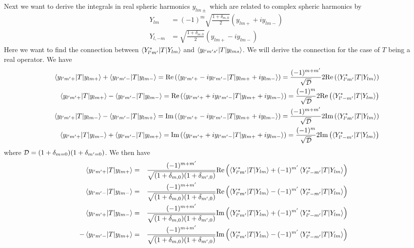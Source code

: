 \documentclass[aps,prb,floatfix,epsfig,singlecolumn,showpacs,preprintnumbers]{revtex4}
\newcommand{\cD}{{\cal D}}
\renewcommand{\Im}{\textrm{Im}}
\renewcommand{\Re}{\textrm{Re}}
\begin{document}
Next we want to derive the integrals in real spheric harmonics
$y_{lm\pm}$ which are related to complex spheric harmonics by
\begin{eqnarray}
&Y_{lm}&=(-1)^m \sqrt{\frac{1+\delta_{m,0}}{2}}(y_{lm+}+i y_{lm-})\\
&Y_{l,-m}&=\sqrt{\frac{1+\delta_{m,0}}{2}}(y_{lm+}-i y_{lm-})
\end{eqnarray}
Here we want to find the connection between 
$\braket{ Y^*_{l'm'}|T|Y_{lm}}$ and $\braket{y_{l'm's'}|T|y_{lms}}$.
We will derive the connection for the case of $T$ being a real operator.
We have
\begin{eqnarray}
&&\braket{ y_{l'm'+}|T|y_{lm+}} + \braket{ y_{l'm'-}|T|y_{lm-}} = \Re\left(\braket{ y_{l'm'+}-i y_{l'm'-}|T|y_{lm+}+ i y_{lm-}} \right)
=\frac{(-1)^{m+m'} }{\sqrt{\cD}} 2\Re\left(\braket{Y_{l'm'}^*|T|Y_{lm}}\right)\nonumber\\
&& \braket{ y_{l'm'+}|T|y_{lm+}} - \braket{ y_{l'm'-}|T|y_{lm-}} = \Re\left(\braket{ y_{l'm'+}+i y_{l'm'-}|T|y_{lm+}+ i y_{lm-}} \right)
= \frac{(-1)^{m}}{\sqrt{\cD}} 2 \Re\left(\braket{Y_{l'-m'}^*|T|Y_{lm}}\right)\nonumber\\
&& \braket{ y_{l'm'+}|T|y_{lm-}} - \braket{ y_{l'm'-}|T|y_{lm+}} = \Im\left(\braket{ y_{l'm'+}-i y_{l'm'-}|T|y_{lm+}+ i y_{lm-}} \right)
= \frac{(-1)^{m+m'}}{\sqrt{\cD}} 2 \Im\left(\braket{Y_{l'm'}^*|T|Y_{lm}}\right)\nonumber\\
&& \braket{ y_{l'm'+}|T|y_{lm-}} + \braket{ y_{l'm'-}|T|y_{lm+}} = \Im\left(\braket{ y_{l'm'+}+i y_{l'm'-}|T|y_{lm+}+ i y_{lm-}} \right)
= \frac{(-1)^{m}}{\sqrt{\cD}} 2 \Im\left(\braket{Y_{l'-m'}^*|T|Y_{lm}}\right)\nonumber
\end{eqnarray}
where $\cD=(1+\delta_{m=0})(1+\delta_{m'=0})$.
We then have
\begin{eqnarray}
\braket{ y_{l'm'+}|T|y_{lm+}}&=& \frac{(-1)^{m+m'}}{\sqrt{(1+\delta_{m,0})(1+\delta_{m',0})}} \Re\left(\braket{Y_{l'm'}^*|T|Y_{lm}}+(-1)^{m'}\braket{Y_{l'-m'}^*|T|Y_{lm}}\right)\\
\braket{ y_{l'm'-}|T|y_{lm-}}&=& \frac{(-1)^{m+m'}}{\sqrt{(1+\delta_{m,0})(1+\delta_{m',0})}} \Re\left(\braket{Y_{l'm'}^*|T|Y_{lm}}-(-1)^{m'}\braket{Y_{l'-m'}^*|T|Y_{lm}}\right)\\
\braket{ y_{l'm'+}|T|y_{lm-}}&=& \frac{(-1)^{m+m'}}{\sqrt{(1+\delta_{m,0})(1+\delta_{m',0})}}  \Im\left(\braket{Y_{l'm'}^*|T|Y_{lm}}+(-1)^{m'}\braket{Y_{l'-m'}^*|T|Y_{lm}}\right)\\
-\braket{ y_{l'm'-}|T|y_{lm+}}&=& \frac{(-1)^{m+m'}}{\sqrt{(1+\delta_{m,0})(1+\delta_{m',0})}} \Im\left(\braket{Y_{l'm'}^*|T|Y_{lm}}-(-1)^{m'}\braket{Y_{l'-m'}^*|T|Y_{lm}}\right)
\end{eqnarray}
\end{document}
